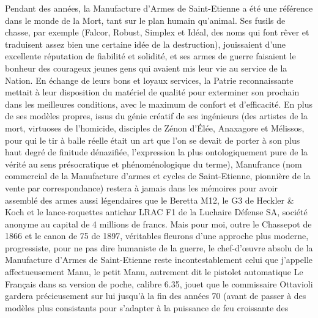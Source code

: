 Pendant des années, la Manufacture d’Armes de Saint-Etienne a été une référence dans le monde de la Mort, tant sur le plan humain qu’animal. Ses fusils de chasse, par exemple (Falcor, Robust, Simplex et Idéal, des noms qui font rêver et traduisent assez bien une certaine idée de la destruction), jouissaient d’une excellente réputation de fiabilité et solidité, et ses armes de guerre faisaient le bonheur des courageux jeunes gens qui avaient mis leur vie au service de la Nation. En échange de leurs bons et loyaux services, la Patrie reconnaissante mettait à leur disposition du matériel de qualité pour exterminer son prochain dans les meilleures conditions, avec le maximum de confort et d’efficacité. En plus de ses modèles propres, issus du génie créatif de ses ingénieurs (des artistes de la mort, virtuoses de l’homicide, disciples de Zénon d’Élée, Anaxagore et Mélissos, pour qui le tir à balle réelle était un art que l’on se devait de porter à son plus haut degré de finitude dénazifiée, l’expression la plus ontologiquement pure de la vérité au sens présocratique et phénoménologique du terme), Manufrance (nom commercial de la Manufacture d’armes et cycles de Saint-Etienne, pionnière de la vente par correspondance) restera à jamais dans les mémoires pour avoir assemblé des armes aussi légendaires que le Beretta M12, le G3 de Heckler \& Koch et le lance-roquettes antichar LRAC F1 de la Luchaire Défense SA, société anonyme au capital de 4 millions de francs. Mais pour moi, outre le Chassepot de 1866 et le canon de 75 de 1897, véritables fleurons d’une approche plus moderne, progressiste, pour ne pas dire humaniste de la guerre, le chef-d’œuvre absolu de la Manufacture d’Armes de Saint-Etienne reste incontestablement celui que j’appelle affectueusement Manu, le petit Manu, autrement dit le pistolet automatique Le Français dans sa version de poche, calibre 6.35, jouet que le commissaire Ottavioli gardera précieusement sur lui jusqu’à la fin des années 70 (avant de passer à des modèles plus consistants pour s’adapter à la puissance de feu croissante des 